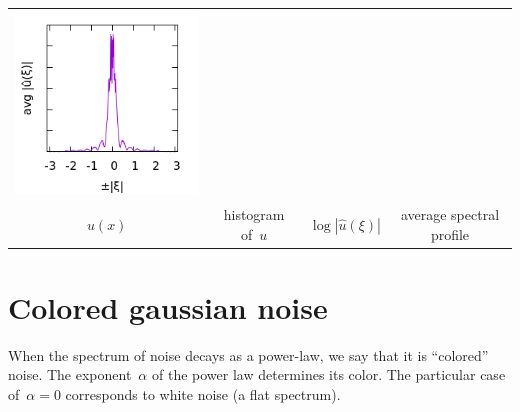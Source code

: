 \begin{tabular}{cccc}
	\includegraphics{s256_p.png} \\
	$u(x)$ &
	histogram of~$u$ &
	$\log|\hat u(\xi)|$ &
	average spectral profile
\end{tabular}



\section{Colored gaussian noise}

When the spectrum of noise decays as a power-law, we say that it is
``colored'' noise.  The exponent~$\alpha$ of the power law determines its
color.  The particular case of~$\alpha=0$ corresponds to white noise (a flat
spectrum).


